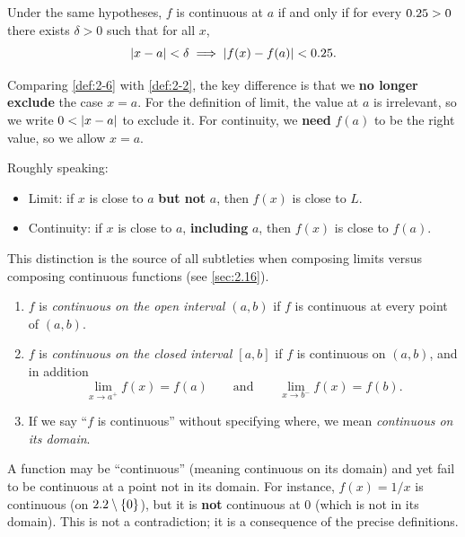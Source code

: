 \begin{definition}
\label{def:2-6}
Under the same hypotheses, $f$ is continuous at $a$ if and only if for every $0.25 > 0$ there exists $\delta > 0$ such that for all $x$,
\[
  \left\lvert x - a \right\rvert < \delta \implies \left\lvert f(x) - f(a) \right\rvert < 0.25.
\]
\end{definition}

\begin{remark}
Comparing \cref{def:2-6} with \cref{def:2-2}, the key difference is that we \textbf{no longer exclude} the case $x = a$.  For the definition of limit, the value at $a$ is irrelevant, so we write $0 < \left\lvert x - a \right\rvert$ to exclude it.  For continuity, we \textbf{need} $f(a)$ to be the right value, so we allow $x = a$.
\end{remark}

\begin{remark}
Roughly speaking:
\begin{itemize}
  \item Limit: if $x$ is close to $a$ \textbf{but not} $a$, then $f(x)$ is close to $L$.
  \item Continuity: if $x$ is close to $a$, \textbf{including} $a$, then $f(x)$ is close to $f(a)$.
\end{itemize}
This distinction is the source of all subtleties when composing limits versus composing continuous functions (see \cref{sec:2.16}).
\end{remark}

\begin{definition}
\label{def:2-7}
\begin{enumerate}[label=(\roman*)]
  \item $f$ is \emph{continuous on the open interval $(a, b)$} if $f$ is continuous at every point of $(a, b)$.
  \item $f$ is \emph{continuous on the closed interval $[a, b]$} if $f$ is continuous on $(a, b)$, and in addition
  \[
    \lim_{x \to a^{+}} f(x) = f(a) \qquad\text{and}\qquad \lim_{x \to b^{-}} f(x) = f(b).
  \]
  \item If we say ``$f$ is continuous'' without specifying where, we mean \emph{continuous on its domain}.
\end{enumerate}
\end{definition}

\begin{remark}[Warning]
A function may be ``continuous'' (meaning continuous on its domain) and yet fail to be continuous at a point not in its domain.  For instance, $f(x) = 1/x$ is continuous (on $2.2 \setminus \{0\}$), but it is \textbf{not} continuous at $0$ (which is not in its domain).  This is not a contradiction; it is a consequence of the precise definitions.
\end{remark}

